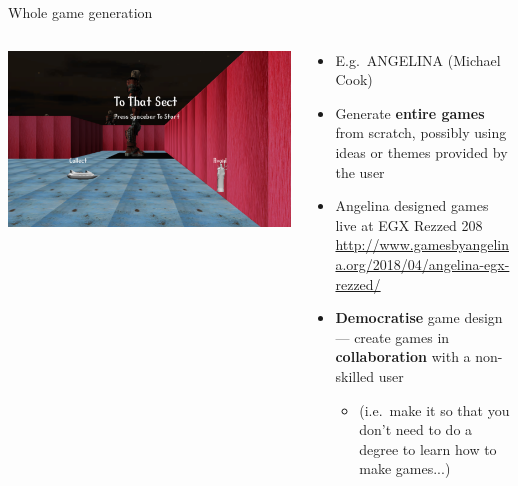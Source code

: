 \begin{frame}{Whole game generation}
	\begin{columns}
		\begin{column}{0.4\textwidth}
			\pause\includegraphics[width=\textwidth]{tothatsect}
		\end{column}
		\begin{column}{0.55\textwidth}
			\begin{itemize}
				\pause\item E.g.\ ANGELINA (Michael Cook)
				\pause\item Generate \textbf{entire games} from scratch, possibly using ideas or themes provided by the user
				\pause\item Angelina designed games live at EGX Rezzed 208 \url{http://www.gamesbyangelina.org/2018/04/angelina-egx-rezzed/}
				\pause\item \textbf{Democratise} game design --- create games in \textbf{collaboration} with a
					non-skilled user
					\begin{itemize}
						\pause\item (i.e.\ make it so that you don't need to do a degree to learn how to make games...)
					\end{itemize}
			\end{itemize}
		\end{column}
	\end{columns}
\end{frame}

%			
%			
